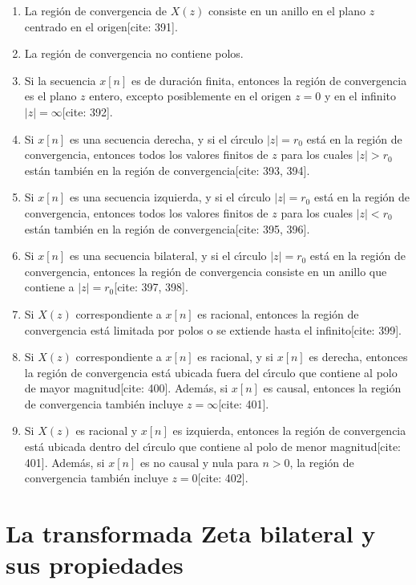 \begin{enumerate}
	\item La regi\'{o}n de convergencia de $X(z)$ consiste en un anillo en el plano $z$ centrado en el origen[cite: 391].
	\item La regi\'{o}n de convergencia no contiene polos.
	\item Si la secuencia $x[n]$ es de duraci\'{o}n finita, entonces la regi\'{o}n de convergencia es el plano $z$ entero, excepto posiblemente en el origen $z=0$ y en el infinito $|z|=\infty$[cite: 392].
	\item Si $x[n]$ es una secuencia derecha, y si el c\'{\i}rculo $|z|=r_{0}$ est\'{a} en la regi\'{o}n de convergencia, entonces todos los valores finitos de $z$ para los cuales $|z|>r_{0}$ est\'{a}n tambi\'{e}n en la regi\'{o}n de convergencia[cite: 393, 394].
	\item Si $x[n]$ es una secuencia izquierda, y si el c\'{\i}rculo $|z|=r_{0}$ est\'{a} en la regi\'{o}n de convergencia, entonces todos los valores finitos de $z$ para los cuales $|z|<r_{0}$ est\'{a}n tambi\'{e}n en la regi\'{o}n de convergencia[cite: 395, 396].
	\item Si $x[n]$ es una secuencia bilateral, y si el c\'{\i}rculo $|z|=r_{0}$ est\'{a} en la regi\'{o}n de convergencia, entonces la regi\'{o}n de convergencia consiste en un anillo que contiene a $|z|=r_{0}$[cite: 397, 398].
	\item Si $X(z)$ correspondiente a $x[n]$ es racional, entonces la regi\'{o}n de convergencia est\'{a} limitada por polos o se extiende hasta el infinito[cite: 399].
	\item Si $X(z)$ correspondiente a $x[n]$ es racional, y si $x[n]$ es derecha, entonces la regi\'{o}n de convergencia est\'{a} ubicada fuera del c\'{\i}rculo que contiene al polo de mayor magnitud[cite: 400]. Adem\'{a}s, si $x[n]$ es causal, entonces la regi\'{o}n de convergencia tambi\'{e}n incluye $z=\infty$[cite: 401].
	\item Si $X(z)$ es racional y $x[n]$ es izquierda, entonces la regi\'{o}n de convergencia est\'{a} ubicada dentro del c\'{\i}rculo que contiene al polo de menor magnitud[cite: 401]. Adem\'{a}s, si $x[n]$ es no causal y nula para $n>0$, la regi\'{o}n de convergencia tambi\'{e}n incluye $z=0$[cite: 402].
\end{enumerate}

\section{La transformada Zeta bilateral y sus propiedades}

